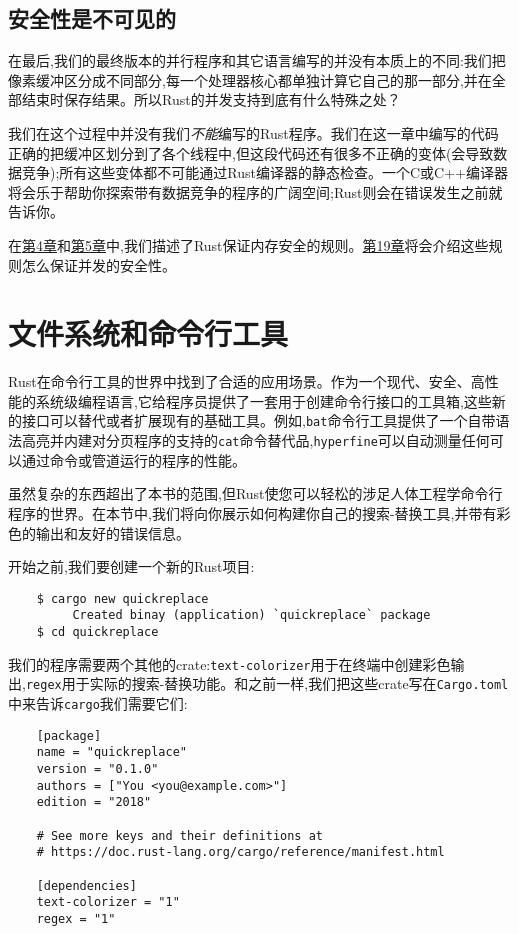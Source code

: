 \subsection{安全性是不可见的}

在最后,我们的最终版本的并行程序和其它语言编写的并没有本质上的不同:我们把像素缓冲区分成不同部分,每一个处理器核心都单独计算它自己的那一部分,并在全部结束时保存结果。所以Rust的并发支持到底有什么特殊之处？

我们在这个过程中并没有我们\emph{不能}编写的Rust程序。我们在这一章中编写的代码正确的把缓冲区划分到了各个线程中,但这段代码还有很多不正确的变体(会导致数据竞争);所有这些变体都不可能通过Rust编译器的静态检查。一个C或C++编译器将会乐于帮助你探索带有数据竞争的程序的广阔空间;Rust则会在错误发生之前就告诉你。

在\hyperref[ch04]{第4章}和\hyperref[ch05]{第5章}中,我们描述了Rust保证内存安全的规则。\hyperref[ch19]{第19章}将会介绍这些规则怎么保证并发的安全性。

\section{文件系统和命令行工具}
Rust在命令行工具的世界中找到了合适的应用场景。作为一个现代、安全、高性能的系统级编程语言,它给程序员提供了一套用于创建命令行接口的工具箱,这些新的接口可以替代或者扩展现有的基础工具。例如,\texttt{bat}命令行工具提供了一个自带语法高亮并内建对分页程序的支持的\texttt{cat}命令替代品,\texttt{hyperfine}可以自动测量任何可以通过命令或管道运行的程序的性能。

虽然复杂的东西超出了本书的范围,但Rust使您可以轻松的涉足人体工程学命令行程序的世界。在本节中,我们将向你展示如何构建你自己的搜索-替换工具,并带有彩色的输出和友好的错误信息。

开始之前,我们要创建一个新的Rust项目:
\begin{verbatim}
    $ cargo new quickreplace
         Created binay (application) `quickreplace` package
    $ cd quickreplace
\end{verbatim}

我们的程序需要两个其他的crate:\texttt{text-colorizer}用于在终端中创建彩色输出,\texttt{regex}用于实际的搜索-替换功能。和之前一样,我们把这些crate写在\texttt{Cargo.toml}中来告诉\texttt{cargo}我们需要它们:
\begin{verbatim}
    [package]
    name = "quickreplace"
    version = "0.1.0"
    authors = ["You <you@example.com>"]
    edition = "2018"

    # See more keys and their definitions at
    # https://doc.rust-lang.org/cargo/reference/manifest.html
    
    [dependencies]
    text-colorizer = "1"
    regex = "1"
\end{verbatim}

